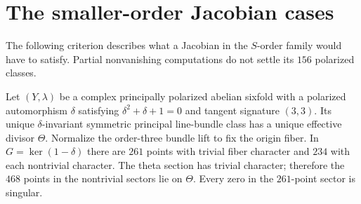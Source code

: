 \section{The smaller-order Jacobian cases}
The following criterion describes what a Jacobian in the $S$-order
family would have to satisfy. Partial nonvanishing computations do not
settle its $156$ polarized classes.

\begin{proposition}
\label{pp:prop:balancedtheta}
Let $(Y,\lambda)$ be a complex principally polarized abelian sixfold
with a polarized automorphism $\delta$ satisfying
$\delta^2+\delta+1=0$ and tangent signature $(3,3)$.
Its unique $\delta$-invariant symmetric principal line-bundle class
has a unique effective divisor $\Theta$. Normalize the order-three
bundle lift to fix the origin fiber. In $G=\ker(1-\delta)$ there
are $261$ points with trivial fiber character and $234$ with each
nontrivial character. The theta section has trivial character;
therefore the $468$ points in the nontrivial sectors lie on $\Theta$.
Every zero in the $261$-point sector is singular.
\end{proposition}
